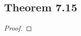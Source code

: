 \documentclass[../../main.tex]{subfiles}
\begin{document}
\subsection{Theorem 7.15}
\begin{wts}

\end{wts}
\begin{proof}

\end{proof}
\end{document}
